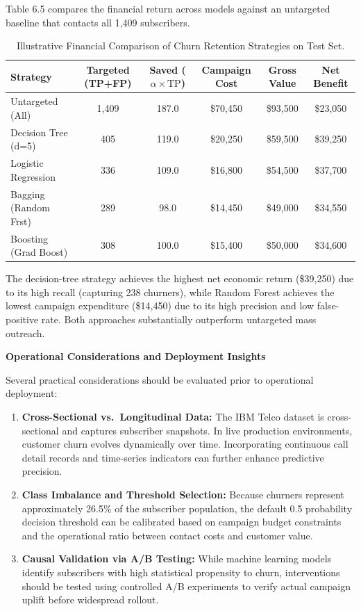 \documentclass[12pt,oneside]{report}
\begin{document}
Table 6.5 compares the financial return across models against an untargeted baseline that contacts all 1,409 subscribers.

\begin{table}[H]
\centering
\small
\caption{Illustrative Financial Comparison of Churn Retention Strategies on Test Set.}
\label{tab:6.5}
\vspace{0.05in}
\begin{tabular}{lccccc}
\toprule
\textbf{Strategy} & \textbf{Targeted (TP+FP)} & \textbf{Saved ($\alpha \times \text{TP}$)} & \textbf{Campaign Cost} & \textbf{Gross Value} & \textbf{Net Benefit} \\
\midrule
Untargeted (All)     & 1,409 & 187.0 & \$70,450 & \$93,500 & \$23,050 \\
Decision Tree (d=5)  & 405   & 119.0 & \$20,250 & \$59,500 & \$39,250 \\
Logistic Regression  & 336   & 109.0 & \$16,800 & \$54,500 & \$37,700 \\
Bagging (Random Frst)& 289   & 98.0  & \$14,450 & \$49,000 & \$34,550 \\
Boosting (Grad Boost)& 308   & 100.0 & \$15,400 & \$50,000 & \$34,600 \\
\bottomrule
\end{tabular}
\end{table}

The decision-tree strategy achieves the highest net economic return (\$39,250) due to its high recall (capturing 238 churners), while Random Forest achieves the lowest campaign expenditure (\$14,450) due to its high precision and low false-positive rate. Both approaches substantially outperform untargeted mass outreach.

\textbf{Operational Considerations and Deployment Insights}

Several practical considerations should be evaluated prior to operational deployment:
\begin{enumerate}
    \item \textbf{Cross-Sectional vs.\ Longitudinal Data:} The IBM Telco dataset is cross-sectional and captures subscriber snapshots. In live production environments, customer churn evolves dynamically over time. Incorporating continuous call detail records and time-series indicators can further enhance predictive precision.
    \item \textbf{Class Imbalance and Threshold Selection:} Because churners represent approximately 26.5\% of the subscriber population, the default 0.5 probability decision threshold can be calibrated based on campaign budget constraints and the operational ratio between contact costs and customer value.
    \item \textbf{Causal Validation via A/B Testing:} While machine learning models identify subscribers with high statistical propensity to churn, interventions should be tested using controlled A/B experiments to verify actual campaign uplift before widespread rollout.
\end{enumerate}
\end{document}
